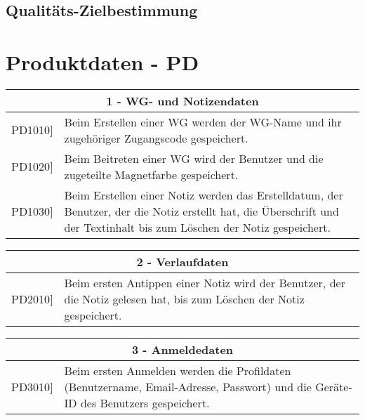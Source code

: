 \documentclass[a4paper]{scrreprt}
\begin{document}
    		
    		\newpage
    		
    		\section{Qualitäts-Zielbestimmung}

    \chapter{Produktdaten - PD}
    	\begin{table}[h!]
    		\centering
    		\label{my-label}
    		\begin{tabular}{p{2cm}p{12cm}}
    			
    			\multicolumn{2}{c}{\textbf{1 - WG- und Notizendaten}} \\ \hline
    			\centering{[}PD1010{]} & Beim Erstellen einer WG werden der WG-Name und ihr zugehöriger Zugangscode gespeichert.\\
    			\centering{[}PD1020{]}& Beim Beitreten einer WG wird der Benutzer und die zugeteilte Magnetfarbe gespeichert.                                 \\
    			\centering{[}PD1030{]}& Beim Erstellen einer Notiz werden das Erstelldatum, der Benutzer, der die Notiz erstellt hat, die Überschrift und der Textinhalt bis zum Löschen der Notiz gespeichert.\\ 
    			\hline
    		\end{tabular}
    	\end{table}
    
        \vspace{5mm}
        
    	\begin{table}[h!]
    		\centering
    		\label{my-label}
    		\begin{tabular}{p{2cm}p{12cm}}
    			
    			\multicolumn{2}{c}{\textbf{2 - Verlaufdaten}} \\ \hline
    			\centering{[}PD2010{]} & Beim ersten Antippen einer Notiz wird der Benutzer, der die Notiz gelesen hat, bis zum Löschen der Notiz gespeichert.\\ 
    			\hline
    		\end{tabular}
    	\end{table}
    	
    	\vspace{5mm}
    	
    	\begin{table}[h!]
    		\centering
    		\label{my-label}
    		\begin{tabular}{p{2cm}p{12cm}}
    			
    			\multicolumn{2}{c}{\textbf{3 - Anmeldedaten}} \\ \hline
    			\centering{[}PD3010{]} & Beim ersten Anmelden werden die Profildaten (Benutzername, Email-Adresse, Passwort) und die Geräte-ID des Benutzers gespeichert.\\ 
    			\hline
    		\end{tabular}
    	\end{table}
    
\end{document}
